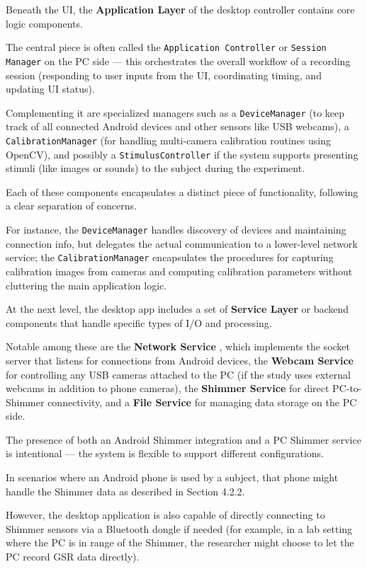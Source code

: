 Beneath the UI, the \textbf{Application Layer}
 of the desktop controller contains core logic components.

The central piece is often called the \texttt{Application Controller} or
\texttt{Session Manager} on the PC side --- this orchestrates the overall workflow of
a recording session (responding to user inputs from the UI, coordinating timing, and
updating UI status).

Complementing it are specialized managers such as a \texttt{DeviceManager} (to keep
track of all connected Android devices and other sensors like USB webcams), a
\texttt{CalibrationManager} (for handling multi-camera calibration routines using
OpenCV), and possibly a \texttt{StimulusController} if the system supports presenting
stimuli (like images or sounds) to the subject during the experiment.

Each of these components encapsulates a distinct piece of functionality, following a
clear separation of concerns.

For instance, the \texttt{DeviceManager} handles discovery of devices and maintaining
connection info, but delegates the actual communication to a lower-level network
service; the \texttt{CalibrationManager} encapsulates the procedures for capturing
calibration images from cameras and computing calibration parameters without
cluttering the main application logic.

At the next level, the desktop app includes a set of \textbf{Service Layer}
 or backend components that handle specific types of I/O and processing.

Notable among these are the \textbf{Network Service}
, which implements the socket server that listens for connections from Android
devices, the \textbf{Webcam Service}
 for controlling any USB cameras attached to the PC (if the study uses external
 webcams in addition to phone cameras), the \textbf{Shimmer Service}
 for direct PC-to-Shimmer connectivity, and a \textbf{File Service}
 for managing data storage on the PC side.

The presence of both an Android Shimmer integration and a PC Shimmer service is
intentional --- the system is flexible to support different configurations.

In scenarios where an Android phone is used by a subject, that phone might handle the
Shimmer data as described in Section 4.2.2.

However, the desktop application is also capable of directly connecting to Shimmer
sensors via a Bluetooth dongle if needed (for example, in a lab setting where the PC
is in range of the Shimmer, the researcher might choose to let the PC record GSR data
directly).

